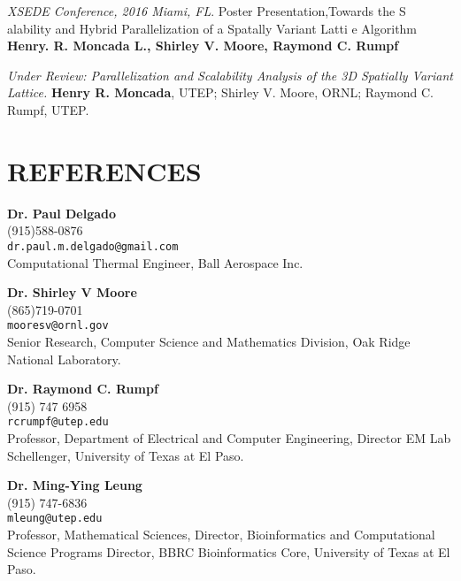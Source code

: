 \documentclass[margin]{res}
\begin{document}
\begin{resume}
{\sl XSEDE Conference, 2016  Miami, FL}.
Poster Presentation,Towards the S
alability and Hybrid Parallelization of a Spatally Variant Latti
e Algorithm
\textbf{Henry. R. Moncada L., Shirley V. Moore, Raymond C. Rumpf}

{\sl Under Review: Parallelization and Scalability Analysis of the 3D Spatially Variant Lattice.}
\textbf{Henry R. Moncada}, UTEP; Shirley V. Moore, ORNL; Raymond C. Rumpf, UTEP.
\newpage
\section{REFERENCES}
{\bf Dr. Paul Delgado} \\
(915)588-0876\\
\verb+dr.paul.m.delgado@gmail.com+\\
Computational Thermal Engineer,
Ball Aerospace Inc.

{\bf Dr. Shirley V Moore}\\
(865)719-0701\\
\verb+mooresv@ornl.gov+\\
Senior Research,
Computer Science and Mathematics Division,
Oak Ridge National Laboratory.

{\bf Dr. Raymond C. Rumpf}\\
(915) 747 6958\\
\verb+rcrumpf@utep.edu+\\
Professor, Department of Electrical and Computer Engineering, 
Director EM Lab Schellenger,
University of Texas at El Paso.

{\bf Dr. Ming-Ying Leung}\\
(915) 747-6836\\%
\verb+mleung@utep.edu+\\
Professor, Mathematical Sciences,
Director, Bioinformatics and Computational Science Programs
Director, BBRC Bioinformatics Core,
University of Texas at El Paso.


\end{resume}
\end{document}
